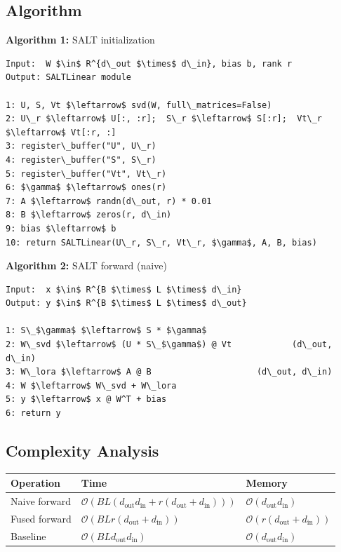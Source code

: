 \subsection{Algorithm}

\textbf{Algorithm 1:} SALT initialization
\begin{lstlisting}
Input:  W $\in$ R^{d\_out $\times$ d\_in}, bias b, rank r
Output: SALTLinear module

1: U, S, Vt $\leftarrow$ svd(W, full\_matrices=False)
2: U\_r $\leftarrow$ U[:, :r];  S\_r $\leftarrow$ S[:r];  Vt\_r $\leftarrow$ Vt[:r, :]
3: register\_buffer("U", U\_r)
4: register\_buffer("S", S\_r)
5: register\_buffer("Vt", Vt\_r)
6: $\gamma$ $\leftarrow$ ones(r)
7: A $\leftarrow$ randn(d\_out, r) * 0.01
8: B $\leftarrow$ zeros(r, d\_in)
9: bias $\leftarrow$ b
10: return SALTLinear(U\_r, S\_r, Vt\_r, $\gamma$, A, B, bias)
\end{lstlisting}

\textbf{Algorithm 2:} SALT forward (naive)
\begin{lstlisting}
Input:  x $\in$ R^{B $\times$ L $\times$ d\_in}
Output: y $\in$ R^{B $\times$ L $\times$ d\_out}

1: S\_$\gamma$ $\leftarrow$ S * $\gamma$
2: W\_svd $\leftarrow$ (U * S\_$\gamma$) @ Vt            (d\_out, d\_in)
3: W\_lora $\leftarrow$ A @ B                     (d\_out, d\_in)
4: W $\leftarrow$ W\_svd + W\_lora
5: y $\leftarrow$ x @ W^T + bias
6: return y
\end{lstlisting}

\subsection{Complexity Analysis}

\begin{table}[H]
\centering
\small
\begin{tabular}{lll}
\toprule
\textbf{Operation} & \textbf{Time} & \textbf{Memory} \\
\midrule
Naive forward & $\mathcal{O}(BL(d_\text{out} d_\text{in} + r(d_\text{out} + d_\text{in})))$ & $\mathcal{O}(d_\text{out} d_\text{in})$ \\
Fused forward & $\mathcal{O}(BL r (d_\text{out} + d_\text{in}))$ & $\mathcal{O}(r(d_\text{out} + d_\text{in}))$ \\
Baseline & $\mathcal{O}(BL d_\text{out} d_\text{in})$ & $\mathcal{O}(d_\text{out} d_\text{in})$ \\
\bottomrule
\end{tabular}
\end{table}

